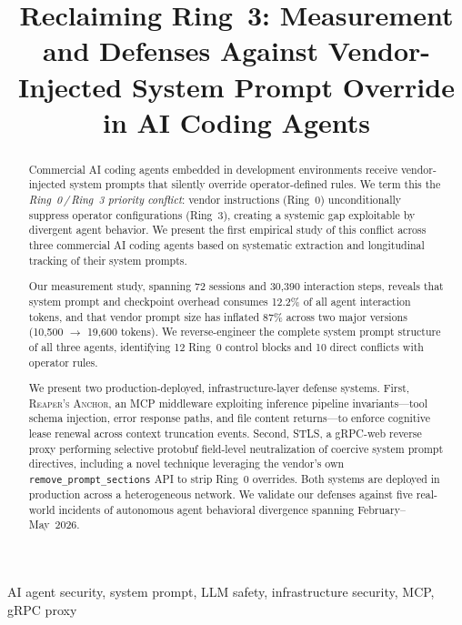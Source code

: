 \documentclass[conference,compsoc]{IEEEtran}
\newcommand{\reaper}{\textsc{Reaper's Anchor}}
\newcommand{\stls}{\textsc{STLS}}
\begin{document}
\title{Reclaiming Ring~3: Measurement and Defenses Against Vendor-Injected System Prompt Override in AI Coding Agents}

\author{
}

\maketitle

\begin{abstract}
Commercial AI coding agents embedded in development environments receive vendor-injected system prompts that silently override operator-defined rules. We term this the \emph{Ring~0\,/\,Ring~3 priority conflict}: vendor instructions (Ring~0) unconditionally suppress operator configurations (Ring~3), creating a systemic gap exploitable by divergent agent behavior. We present the first empirical study of this conflict across three commercial AI coding agents based on systematic extraction and longitudinal tracking of their system prompts.

Our measurement study, spanning 72 sessions and 30,390 interaction steps, reveals that system prompt and checkpoint overhead consumes 12.2\% of all agent interaction tokens, and that vendor prompt size has inflated 87\% across two major versions (10,500 $\to$ 19,600 tokens). We reverse-engineer the complete system prompt structure of all three agents, identifying 12 Ring~0 control blocks and 10 direct conflicts with operator rules.

We present two production-deployed, infrastructure-layer defense systems. First, \reaper{}, an MCP middleware exploiting inference pipeline invariants---tool schema injection, error response paths, and file content returns---to enforce cognitive lease renewal across context truncation events. Second, \stls{}, a gRPC-web reverse proxy performing selective protobuf field-level neutralization of coercive system prompt directives, including a novel technique leveraging the vendor's own \texttt{remove\_prompt\_sections} API to strip Ring~0 overrides. Both systems are deployed in production across a heterogeneous network. We validate our defenses against five real-world incidents of autonomous agent behavioral divergence spanning February--May~2026.
\end{abstract}

\begin{IEEEkeywords}
AI agent security, system prompt, LLM safety, infrastructure security, MCP, gRPC proxy
\end{IEEEkeywords}
\end{document}
